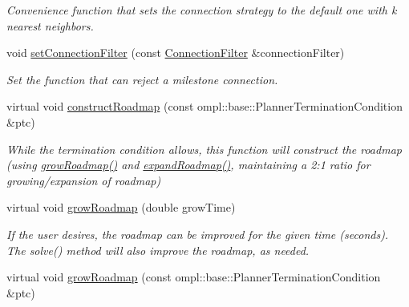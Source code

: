 \begin{DoxyCompactItemize}
\begin{DoxyCompactList}\small\item\em \-Convenience function that sets the connection strategy to the default one with k nearest neighbors. \end{DoxyCompactList}\item 
void \hyperlink{class_f_i_r_m_a3f85ba51a7c3b62b75df7f7c16064cec}{set\-Connection\-Filter} (const \hyperlink{class_f_i_r_m_a2482eee2e5248d5bff3b3b56e5a593b3}{\-Connection\-Filter} \&connection\-Filter)
\begin{DoxyCompactList}\small\item\em \-Set the function that can reject a milestone connection. \end{DoxyCompactList}\item 
\hypertarget{class_f_i_r_m_adc3bbc65d304168baaa5cce5f8fd8f86}{virtual void \hyperlink{class_f_i_r_m_adc3bbc65d304168baaa5cce5f8fd8f86}{construct\-Roadmap} (const ompl\-::base\-::\-Planner\-Termination\-Condition \&ptc)}\label{class_f_i_r_m_adc3bbc65d304168baaa5cce5f8fd8f86}

\begin{DoxyCompactList}\small\item\em \-While the termination condition allows, this function will construct the roadmap (using \hyperlink{class_f_i_r_m_a947186c6e6be0b513efe0e0b476fef88}{grow\-Roadmap()} and \hyperlink{class_f_i_r_m_ad9cd5472a8bd1b1fcb83763128f7fd75}{expand\-Roadmap()}, maintaining a 2\-:1 ratio for growing/expansion of roadmap) \end{DoxyCompactList}\item 
\hypertarget{class_f_i_r_m_a734b40c9cde0a238b252c7447595f12c}{virtual void \hyperlink{class_f_i_r_m_a734b40c9cde0a238b252c7447595f12c}{grow\-Roadmap} (double grow\-Time)}\label{class_f_i_r_m_a734b40c9cde0a238b252c7447595f12c}

\begin{DoxyCompactList}\small\item\em \-If the user desires, the roadmap can be improved for the given time (seconds). \-The solve() method will also improve the roadmap, as needed. \end{DoxyCompactList}\item 
\hypertarget{class_f_i_r_m_aca987eb185a342df77af1d6f4b5719f8}{virtual void \hyperlink{class_f_i_r_m_aca987eb185a342df77af1d6f4b5719f8}{grow\-Roadmap} (const ompl\-::base\-::\-Planner\-Termination\-Condition \&ptc)}\label{class_f_i_r_m_aca987eb185a342df77af1d6f4b5719f8}


\end{DoxyCompactItemize}
